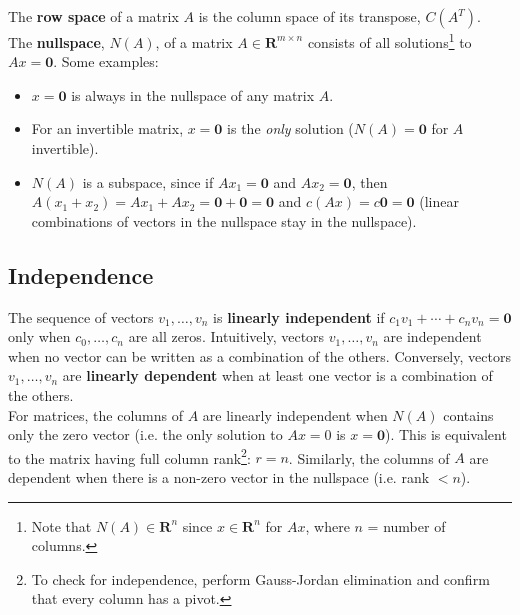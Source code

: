 \documentclass[11pt]{article}
\theoremstyle{plain}
\theoremstyle{definition}
\theoremstyle{remark}
\numberwithin{equation}{section}
\begin{document}
The {\bf row space} of a matrix $A$ is the column space of its transpose, $C(A^T)$.
\\

The {\bf nullspace}, $N(A)$, of a matrix $A \in \mathbf{R}^{m \times n}$ consists of all solutions\footnote{Note that $N(A) \in \mathbf{R}^n$ since $x \in \mathbf{R}^n$ for $Ax$, where $n$ = number of columns.} to $A x = \mathbf{0}$. Some examples:
\begin{itemize}[noitemsep]
\item $x = \mathbf{0}$ is always in the nullspace of any matrix $A$.
\item For an invertible matrix, $x = \mathbf{0}$ is the {\it only} solution ($N(A) = \mathbf{0}$ for $A$ invertible).
\item $N(A)$ is a subspace, since if $A x_1 = \mathbf{0}$ and $A x_2 = \mathbf{0}$, then $A(x_1 + x_2) = A x_1 + A x_2 = \mathbf{0} + \mathbf{0} = \mathbf{0}$ and $c (A x) = c  \mathbf{0} = \mathbf{0}$ (linear combinations of vectors in the nullspace stay in the nullspace).
\end{itemize}




\subsection{Independence}

The sequence of vectors $v_1, \dots, v_n$ is {\bf linearly independent} if $c_1 v_1 + \cdots + c_n v_n = \mathbf{0}$ only when $c_0, \dots, c_n$ are all zeros. Intuitively, vectors $v_1, \dots, v_n$ are independent when no vector can be written as a combination of the others. Conversely, vectors $v_1, \dots, v_n$ are {\bf linearly dependent} when at least one vector is a combination of the others.
\\

For matrices, the columns of $A$ are linearly independent when $N(A)$ contains only the zero vector (i.e. the only solution to $A x = 0$ is $x = \mathbf{0}$). This is equivalent to the matrix having full column rank\footnote{To check for independence, perform Gauss-Jordan elimination and confirm that every column has a pivot.}: $r = n$. Similarly, the columns of $A$ are dependent when there is a non-zero vector in the nullspace (i.e. rank $< n$).
\\
\end{document}
